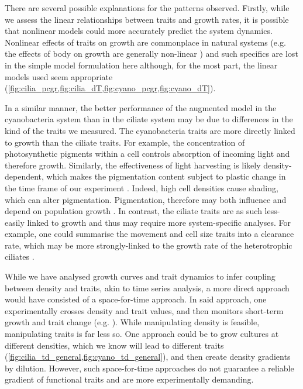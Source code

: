 \documentclass{article}
\begin{document}
There are several possible explanations for the patterns observed. Firstly, while we assess the linear relationships between traits and growth rates, it is possible that nonlinear models could more accurately predict the system dynamics. Nonlinear effects of traits on growth are commonplace in natural systems (e.g. the effects of body on growth are generally non-linear \cite{Fernandez-Gonzalez2021}) and such specifics are lost in the simple model formulation here although, for the most part, the linear models used seem appropriate (\cref{fig:cilia_pcgr,fig:cilia_dT,fig:cyano_pcgr,fig:cyano_dT}).

In a similar manner, the better performance of the augmented model in the cyanobacteria system than in the ciliate system may be due to differences in the kind of the traits we measured. The cyanobacteria traits are more directly linked to growth than the ciliate traits. For example, the concentration of photosynthetic pigments within a cell controls absorption of incoming light and therefore growth. Similarly, the effectiveness of light harvesting is likely density-dependent, which makes the pigmentation content subject to plastic change in the time frame of our experiment \cite{Stomp2004}. Indeed, high cell densities cause shading, which can alter pigmentation. Pigmentation, therefore may both influence and depend on population growth \cite{Maranon2015,Stomp2007a}. In contrast, the ciliate traits are as such less-easily linked to growth and thus may require more system-specific analyses. For example, one could summarise the movement and cell size traits into a clearance rate, which may be more strongly-linked to the growth rate of the heterotrophic ciliates \cite{Kiorboe1995,Jacob2019}.

While we have analysed growth curves and trait dynamics to infer coupling between density and traits, akin to time series analysis, a more direct approach would have consisted of a space-for-time approach. In said approach, one experimentally crosses density and trait values, and then monitors short-term growth and trait change (e.g. \cite{Wieczynski2021}). While manipulating density is feasible, manipulating traits is far less so. One approach could be to grow cultures at different densities, which we know will lead to different traits (\cref{fig:cilia_td_general,fig:cyano_td_general}), and then create density gradients by dilution. However, such space-for-time approaches do not guarantee a reliable gradient of functional traits and are more experimentally demanding.
\end{document}
